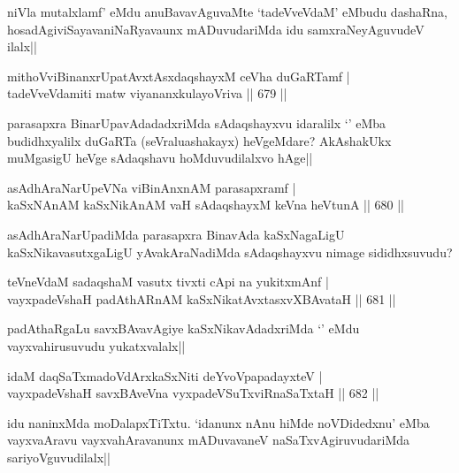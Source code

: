 \begin{artha}
niVla mutalxlamf' eMdu anuBavavAguvaMte `tadeVveVdaM' eMbudu dashaRna, hosadAgiviSayavaniNaRyavaunx mADuvudariMda idu samxraNeyAguvudeV ilalx||
\end{artha}

\begin{shl}
mithoVviBinanxrUpatAvxtAsxdaqshayxM ceVha duGaRTamf | \\
tadeVveVdamiti matw viyananxkulayoVriva \hfill||  679 ||  
\end{shl}

\begin{artha}
parasapxra BinarUpavAdadadxriMda sAdaqshayxvu idaralilx `\stext' eMba budidhxyalilx duGaRTa (seVraluashakayx) heVgeMdare? AkAshakUkx muMgasigU heVge sAdaqshavu hoMduvudilalxvo hAge||
\end{artha}

\begin{shl}
asAdhAraNarUpeVNa viBinAnxnAM parasapxramf | \\
kaSxNAnAM kaSxNikAnAM vaH sAdaqshayxM keVna heVtunA \hfill||  680 ||  
\end{shl}

\begin{artha}
asAdhAraNarUpadiMda parasapxra BinavAda kaSxNagaLigU kaSxNikavasutxgaLigU yAvakAraNadiMda sAdaqshayxvu nimage sididhxsuvudu? 
\end{artha}


\begin{shl}
teVneVdaM sadaqshaM vasutx tivxti cApi na yukitxmAnf | \\
vayxpadeVshaH padAthARnAM kaSxNikatAvxtasxvXBAvataH \hfill||  681 ||  
\end{shl}

\begin{artha}
padAthaRgaLu savxBAvavAgiye kaSxNikavAdadxriMda `\stext' eMdu vayxvahirusuvudu yukatxvalalx||
\end{artha}

\begin{shl}
idaM daqSaTxmadoV\s dArxkaSxNiti deYvoVpapadayxteV | \\
vayxpadeVshaH savxBAveVna vyxpadeVSuTxviRnaSaTxtaH \hfill||  682 ||  
\end{shl}

\begin{artha}
idu naninxMda moDalapxTiTxtu. `idanunx nAnu hiMde noVDidedxnu' eMba vayxvaAravu vayxvahAravanunx mADuvavaneV naSaTxvAgiruvudariMda sariyoVguvudilalx||
\end{artha}

